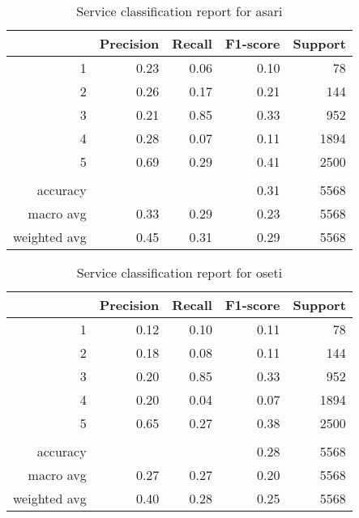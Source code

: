 \documentclass[12pt]{article}
\begin{document}
	\begin{table}
		\begin{center}
			{\renewcommand{\arraystretch}{1.5}
				\renewcommand{\tabcolsep}{0.2cm}
				\begin{tabular}{r r r r r}
					& Precision & Recall & F1-score & Support\\
					\hline
					1 & 0.23 & 0.06 & 0.10 & 78\\
					2 & 0.26 & 0.17 & 0.21 & 144\\
					3 & 0.21 & 0.85 & 0.33 & 952\\
					4 & 0.28 & 0.07 & 0.11 & 1894\\
					5 & 0.69 & 0.29 & 0.41 & 2500\\
					& & & & \\
					accuracy & & & 0.31 & 5568\\
					macro avg & 0.33 & 0.29 & 0.23 & 5568\\
					weighted avg & 0.45 & 0.31 & 0.29 & 5568
			\end{tabular}}
		\end{center}
		\caption{Service classification report for asari}
	\end{table}
	
	\begin{table}
		\begin{center}
			{\renewcommand{\arraystretch}{1.5}
				\renewcommand{\tabcolsep}{0.2cm}
				\begin{tabular}{r r r r r}
					& Precision & Recall & F1-score & Support\\
					\hline
					1 & 0.12 & 0.10 & 0.11 & 78\\
					2 & 0.18 & 0.08 & 0.11 & 144\\
					3 & 0.20 & 0.85 & 0.33 & 952\\
					4 & 0.20 & 0.04 & 0.07 & 1894\\
					5 & 0.65 & 0.27 & 0.38 & 2500\\
					& & & & \\
					accuracy & & & 0.28 & 5568\\
					macro avg & 0.27 & 0.27 & 0.20 & 5568\\
					weighted avg & 0.40 & 0.28 & 0.25 & 5568
			\end{tabular}}
		\end{center}
		\caption{Service classification report for oseti}
	\end{table}
	
\end{document}
